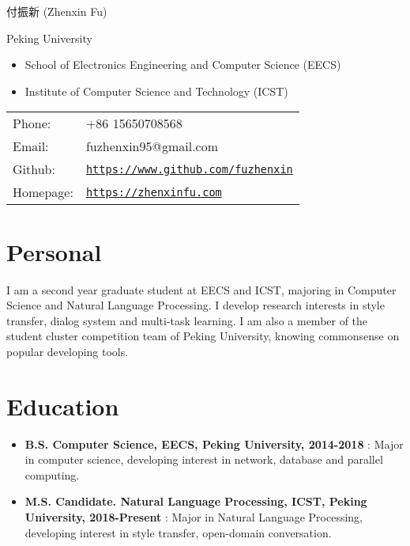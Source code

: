 \documentclass[letterpaper]{article}
\begin{document}


{\huge 付振新 (Zhenxin Fu)}


\vspace{0.25in}

\begin{minipage}{0.45\linewidth}
  \begin{large}Peking University\end{large}
  \begin{itemize}
    \itemsep=-0.02in
      \item School of Electronics Engineering and Computer Science (EECS)
      \item Institute of Computer Science and Technology (ICST)
  \end{itemize}
  
\end{minipage}
\begin{minipage}{0.45\linewidth}
  \begin{tabular}{ll}
    Phone: & +86 15650708568 \\
    Email: & fuzhenxin95@gmail.com \\
    Github: & \href{http://www.github.com/fuzhenxin}{\tt https://www.github.com/fuzhenxin} \\
    Homepage: & \href{https://zhenxinfu.com}{\tt https://zhenxinfu.com} \\
  \end{tabular}
\end{minipage}


\section*{Personal}
I am a second year graduate student at EECS and ICST, majoring in Computer Science and Natural Language Processing. I develop research interests in style transfer, dialog system and multi-task learning. I am also a member of the student cluster competition team of Peking University, knowing commonsense on popular developing tools. 


\section*{Education}
\begin{itemize}
  \item \textbf{B.S. Computer Science, EECS, Peking University, 2014-2018} : Major in computer science, developing interest in network, database and parallel computing.
  \item \textbf{M.S. Candidate. Natural Language Processing, ICST, Peking University, 2018-Present} : Major in Natural Language Processing, developing interest in style transfer, open-domain conversation.
\end{itemize}
\end{document}
